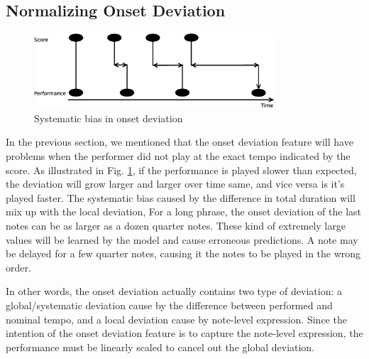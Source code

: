    \subsection{Normalizing Onset Deviation}
   \label{sec:normalize}
\begin{figure}[tp]
   \begin{center}
      \includegraphics[width=0.8\textwidth]{fig/prob_onset_diff}

   \end{center}
   \caption{Systematic bias in onset deviation }
   \label{fig:normalizationprob}
\end{figure}
%
In the previous section, we mentioned that the onset deviation feature will have problems when the performer did not play at the exact tempo indicated by the score. As illustrated in Fig. \ref{fig:normalizationprob}, if the performance is played slower than expected, the deviation will grow larger and larger over time same, and vice versa is it's played faster. The systematic bias caused by the difference in total duration will mix up with the local deviation, For a long phrase, the onset deviation of the last notes can be as larger as a dozen quarter notes. These kind of extremely large values will be learned by the model and cause erroneous predictions. A note may be delayed for a few quarter notes, causing it the notes to be played in the wrong order.
 
In other words, the onset deviation actually contains two type of deviation: a global/systematic deviation cause by the difference between performed and nominal tempo, and a local deviation cause by note-level expression. Since the intention of the onset deviation feature is to capture the note-level expression, the performance must be linearly scaled to cancel out the global deviation.

